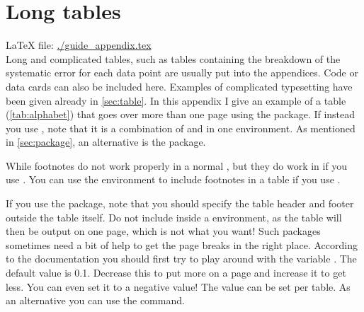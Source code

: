\chapter{Long tables}%
\label{sec:app:tables}

\LaTeX{} file: \url{./guide_appendix.tex}\\[1ex]
\noindent
Long and complicated tables, such as tables containing the breakdown
of the systematic error for each data point are usually put into the
appendices. Code or data cards can also be included here.  Examples of
complicated typesetting have been given already in
\cref{sec:table}. In this appendix I give an example of a table
(\cref{tab:alphabet}) that goes over more than one page using the
 package. If instead you use ,
note that it is a
combination of  and  in one
environment. 
As mentioned in \cref{sec:package}, an alternative
is the  package.
 
While footnotes do not work properly in a
normal , but they do work in 
if you use .
You can use the  environment to include footnotes in a table
if you use .

If you use the  package, 
note that you should specify the table header and footer outside the table itself.
Do not include  inside a  environment, as the table will
then be output on one page, which is not what you want!
Such packages sometimes need a bit of help to get the page breaks in the right place.
According to the  documentation you should first try to play
around with the variable . The default value is \num{0.1}.
Decrease this to put more on a page and increase it to get less.
You can even set it to a negative value!
The value can be set per table.
As an alternative you can use the  command.

